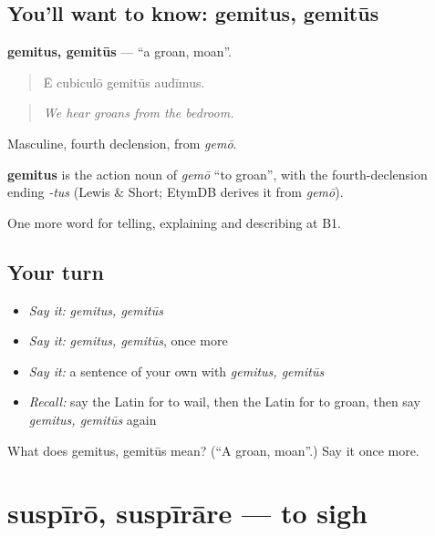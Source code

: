 \subsection*{You'll want to know: gemitus, gemitūs}
\textbf{gemitus, gemitūs} — \textquotedblleft{}a groan, moan\textquotedblright{}.

\begin{quote}
Ē cubiculō gemitūs audīmus.
\end{quote}

\begin{quote}
\emph{We hear groans from the bedroom.}
\end{quote}

Masculine, fourth declension, from \emph{gemō}.

\begin{cousinweb}
\textbf{gemitus} is the action noun of \emph{gemō} \textquotedblleft{}to groan\textquotedblright{}, with the fourth-declension ending \emph{-tus} (Lewis \& Short; EtymDB derives it from \emph{gemō}).
\end{cousinweb}

\begin{grammarlens}[title={What you've built}]
One more word for telling, explaining and describing at B1.
\end{grammarlens}

\subsection*{Your turn}
\begin{itemize}
\raggedright
  \item \emph{Say it:} \emph{gemitus, gemitūs}
  \item \emph{Say it:} \emph{gemitus, gemitūs}, once more
  \item \emph{Say it:} a sentence of your own with \emph{gemitus, gemitūs}
  \item \emph{Recall:} say the Latin for to wail, then the Latin for to groan, then say \emph{gemitus, gemitūs} again
\end{itemize}

\begin{tcolorbox}[breakable,colback=teal!4,colframe=teal!35!black,title={Before you move on}]
What does gemitus, gemitūs mean? (\textquotedblleft{}A groan, moan\textquotedblright{}.) Say it once more.
\end{tcolorbox}
\section[suspīrō, suspīrāre]{suspīrō, suspīrāre — to sigh}

